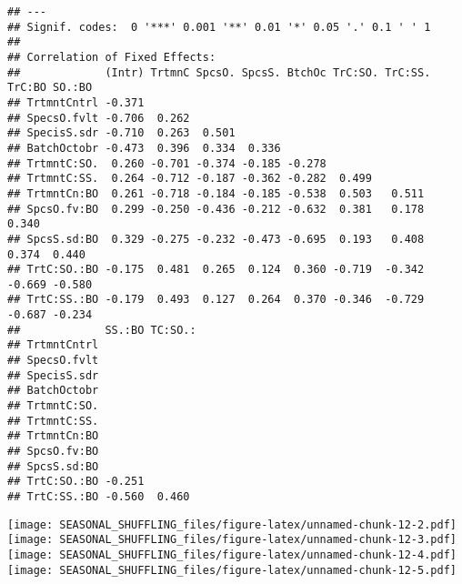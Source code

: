 \documentclass[]{article}
\newenvironment{Shaded}{\begin{snugshade}}{\end{snugshade}}
\newcommand{\CommentTok}[1]{\textcolor[rgb]{0.56,0.35,0.01}{\textit{#1}}}
\newcommand{\DataTypeTok}[1]{\textcolor[rgb]{0.13,0.29,0.53}{#1}}
\newcommand{\KeywordTok}[1]{\textcolor[rgb]{0.13,0.29,0.53}{\textbf{#1}}}
\newcommand{\NormalTok}[1]{#1}
\newcommand{\OperatorTok}[1]{\textcolor[rgb]{0.81,0.36,0.00}{\textbf{#1}}}
\newcommand{\StringTok}[1]{\textcolor[rgb]{0.31,0.60,0.02}{#1}}
\begin{document}
\begin{verbatim}
## ---
## Signif. codes:  0 '***' 0.001 '**' 0.01 '*' 0.05 '.' 0.1 ' ' 1
## 
## Correlation of Fixed Effects:
##             (Intr) TrtmnC SpcsO. SpcsS. BtchOc TrC:SO. TrC:SS. TrC:BO SO.:BO
## TrtmntCntrl -0.371                                                          
## SpecsO.fvlt -0.706  0.262                                                   
## SpecisS.sdr -0.710  0.263  0.501                                            
## BatchOctobr -0.473  0.396  0.334  0.336                                     
## TrtmntC:SO.  0.260 -0.701 -0.374 -0.185 -0.278                              
## TrtmntC:SS.  0.264 -0.712 -0.187 -0.362 -0.282  0.499                       
## TrtmntCn:BO  0.261 -0.718 -0.184 -0.185 -0.538  0.503   0.511               
## SpcsO.fv:BO  0.299 -0.250 -0.436 -0.212 -0.632  0.381   0.178   0.340       
## SpcsS.sd:BO  0.329 -0.275 -0.232 -0.473 -0.695  0.193   0.408   0.374  0.440
## TrtC:SO.:BO -0.175  0.481  0.265  0.124  0.360 -0.719  -0.342  -0.669 -0.580
## TrtC:SS.:BO -0.179  0.493  0.127  0.264  0.370 -0.346  -0.729  -0.687 -0.234
##             SS.:BO TC:SO.:
## TrtmntCntrl               
## SpecsO.fvlt               
## SpecisS.sdr               
## BatchOctobr               
## TrtmntC:SO.               
## TrtmntC:SS.               
## TrtmntCn:BO               
## SpcsO.fv:BO               
## SpcsS.sd:BO               
## TrtC:SO.:BO -0.251        
## TrtC:SS.:BO -0.560  0.460
\end{verbatim}

\begin{Shaded}
\end{Shaded}

\texttt{[image: SEASONAL\_SHUFFLING\_files/figure-latex/unnamed-chunk-12-2.pdf]}
\texttt{[image: SEASONAL\_SHUFFLING\_files/figure-latex/unnamed-chunk-12-3.pdf]}
\texttt{[image: SEASONAL\_SHUFFLING\_files/figure-latex/unnamed-chunk-12-4.pdf]}
\texttt{[image: SEASONAL\_SHUFFLING\_files/figure-latex/unnamed-chunk-12-5.pdf]}
\end{document}
